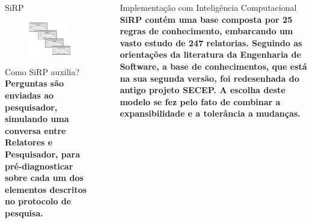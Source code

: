 \documentclass[final]{beamer}
\newlength{\sepwid}
\newlength{\onecolwid}
\begin{document}
\begin{frame}[t]
\begin{columns}[t]
\begin{column}{\onecolwid}
\begin{block}{SiRP}
\begin{figure}
\vspace*{1cm}
\includegraphics[width=.85\linewidth]{telas.png}
\end{figure}
\end{block}

\begin{block}{Como SiRP auxilia?}
\textbf{Perguntas são enviadas ao pesquisador, simulando uma conversa entre Relatores e Pesquisador, para pré-diagnosticar sobre cada um dos elementos descritos no protocolo de pesquisa.}
\end{block}

\end{column} %
\begin{column}{\sepwid}\end{column} %
\begin{column}{\onecolwid} %
\vspace{1em}
 \begin{block}{Implementação com Inteligência Computacional}
 \textbf{SiRP contém uma base composta por 25 regras de conhecimento, embarcando um vasto estudo de 247 relatorias. Seguindo as orientações da literatura da Engenharia de Software, a base de conhecimentos, que está na sua segunda versão, foi redesenhada do antigo projeto SECEP. A escolha deste modelo se fez pelo fato de combinar a expansibilidade e a tolerância a mudanças.}


\end{block}
\end{column}
\end{columns}
\end{frame}
\end{document}

